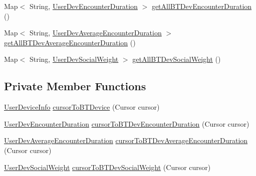 \begin{DoxyCompactItemize}
\item 
Map$<$ String, \hyperlink{classcom_1_1copelabs_1_1oiframework_1_1socialproximity_1_1_user_dev_encounter_duration}{User\+Dev\+Encounter\+Duration} $>$ \hyperlink{classcom_1_1copelabs_1_1oiframework_1_1socialproximity_1_1_data_base_a6d2b37eedd80b2844908c7d0e2681c4a}{get\+All\+B\+T\+Dev\+Encounter\+Duration} ()
\item 
Map$<$ String, \hyperlink{classcom_1_1copelabs_1_1oiframework_1_1socialproximity_1_1_user_dev_average_encounter_duration}{User\+Dev\+Average\+Encounter\+Duration} $>$ \hyperlink{classcom_1_1copelabs_1_1oiframework_1_1socialproximity_1_1_data_base_ac3a55b6ad487c4a23aa0c410cc212735}{get\+All\+B\+T\+Dev\+Average\+Encounter\+Duration} ()
\item 
Map$<$ String, \hyperlink{classcom_1_1copelabs_1_1oiframework_1_1socialproximity_1_1_user_dev_social_weight}{User\+Dev\+Social\+Weight} $>$ \hyperlink{classcom_1_1copelabs_1_1oiframework_1_1socialproximity_1_1_data_base_afaecc4212e79eb8e3cbc278a61df384d}{get\+All\+B\+T\+Dev\+Social\+Weight} ()
\end{DoxyCompactItemize}
\subsection*{Private Member Functions}
\begin{DoxyCompactItemize}
\item 
\hyperlink{classcom_1_1copelabs_1_1oiframework_1_1socialproximity_1_1_user_device_info}{User\+Device\+Info} \hyperlink{classcom_1_1copelabs_1_1oiframework_1_1socialproximity_1_1_data_base_aacb7cf060e6c9beb910dd3b7d6e6c28f}{cursor\+To\+B\+T\+Device} (Cursor cursor)
\item 
\hyperlink{classcom_1_1copelabs_1_1oiframework_1_1socialproximity_1_1_user_dev_encounter_duration}{User\+Dev\+Encounter\+Duration} \hyperlink{classcom_1_1copelabs_1_1oiframework_1_1socialproximity_1_1_data_base_aa7ca3d5a2ef209e1069cc50a7a7f8001}{cursor\+To\+B\+T\+Dev\+Encounter\+Duration} (Cursor cursor)
\item 
\hyperlink{classcom_1_1copelabs_1_1oiframework_1_1socialproximity_1_1_user_dev_average_encounter_duration}{User\+Dev\+Average\+Encounter\+Duration} \hyperlink{classcom_1_1copelabs_1_1oiframework_1_1socialproximity_1_1_data_base_a721eca3539873c0f70e00352f23a2af9}{cursor\+To\+B\+T\+Dev\+Average\+Encounter\+Duration} (Cursor cursor)
\item 
\hyperlink{classcom_1_1copelabs_1_1oiframework_1_1socialproximity_1_1_user_dev_social_weight}{User\+Dev\+Social\+Weight} \hyperlink{classcom_1_1copelabs_1_1oiframework_1_1socialproximity_1_1_data_base_aca2a04c6c4825fa864b3cfd08689ec83}{cursor\+To\+B\+T\+Dev\+Social\+Weight} (Cursor cursor)
\end{DoxyCompactItemize}
